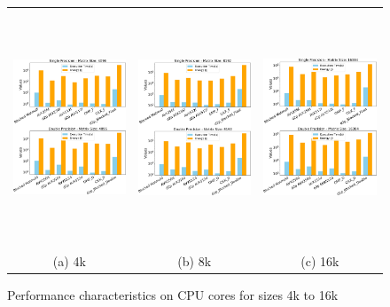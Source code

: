 \begin{figure}[ht]
\centering
\begin{tabular}{ccc}
    \includegraphics[width=0.32\linewidth,height=7cm]{Images/cpu4k-crop.pdf} &
    \includegraphics[width=0.32\linewidth,height=7cm]{Images/cpu8k-crop.pdf} &
    \includegraphics[width=0.32\linewidth,height=7cm]{Images/cpu16k-crop.pdf}\\ 
    (a) 4k & (b) 8k & (c) 16k \\
\end{tabular}
\caption{Performance characteristics on CPU cores for sizes 4k to 16k}
\label{fig:cpumulticore}
\end{figure}
